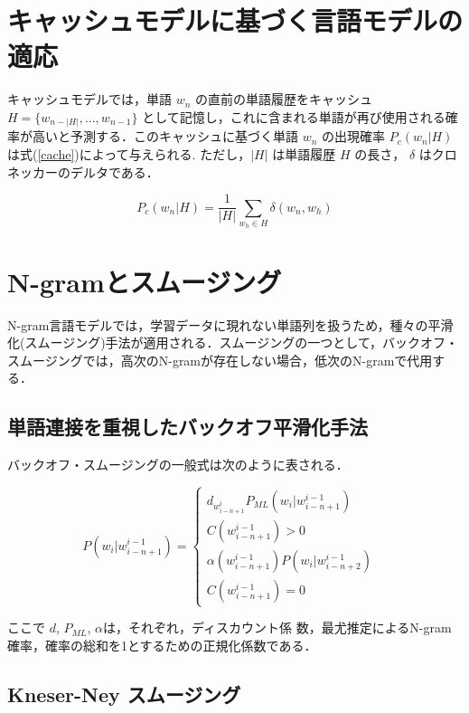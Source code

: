 \section{キャッシュモデルに基づく言語モデルの適応}
キャッシュモデルでは，単語 $w_n$ の直前の単語履歴をキャッシュ $H = \{ w_{n-|H|}, ..., w_{n-1}\} $ として記憶し，これに含まれる単語が再び使用される確率が高いと予測する．このキャッシュに基づく単語 $w_n$ の出現確率 $P_c(w_n|H)$ は式(\ref{cache})によって与えられる. ただし，$|H|$ は単語履歴 $H$ の長さ， $\delta$ はクロネッカーのデルタである．

\begin{equation}
		P_c(w_n|H) = \frac{1}{|H|} \sum_{w_h \in H} \delta (w_n, w_h)
    \label{cache}
\end{equation}

\section{N-gramとスムージング}

N-gram言語モデルでは，学習データに現れない単語列を扱うため，種々の平滑化(スムージング)手法が適用される．スムージングの一つとして，バックオフ・スムージングでは，高次のN-gramが存在しない場合，低次のN-gramで代用する．

\subsection{単語連接を重視したバックオフ平滑化手法}
バックオフ・スムージングの一般式は次のように表される．

\begin{equation}
		P(w_i|w_{i-n+1}^{i-1}) = 
    \begin{cases} 
        d_{w_{i-n+1}^i} P_{ML}(w_i|w_{i-n+1}^{i-1}) & \\ C(w_{i-n+1}^{i-1}) > 0\\ 
        \alpha(w_{i-n+1}^{i-1})P(w_i|w_{i-n+2}^{i-1}) & \\ C(w_{i-n+1}^{i-1}) = 0
    \end{cases} 
    \label{ngram_smoosing1}
\end{equation}

ここで $d$, $P_{ML}$, $\alpha$は，それぞれ，ディスカウント係
数，最尤推定によるN-gram確率，確率の総和を1とするための正規化係数である．

\subsection{Kneser-Ney スムージング}

